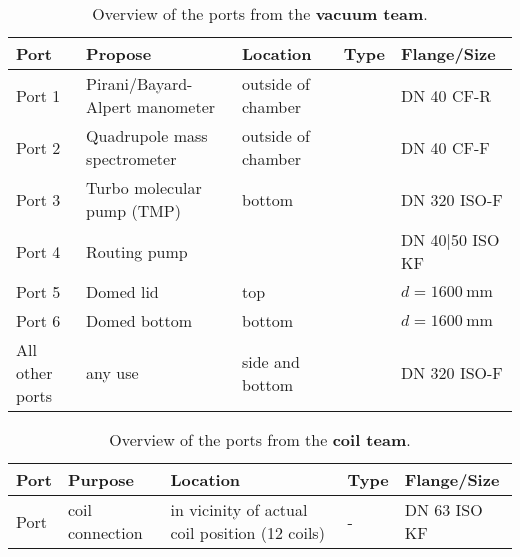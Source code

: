 \documentclass{article}
\begin{document}
\begin{table}[H]
    \centering
    \caption{Overview of the ports from the \textbf{vacuum team}.}
    \begin{tabular}{>{\raggedright\arraybackslash}p{2cm} >{\raggedright\arraybackslash}p{3cm} >{\raggedright\arraybackslash}p{3.5cm} >{\raggedright\arraybackslash}p{2cm} >{\raggedright\arraybackslash}p{3.5cm}}
        \toprule
        \textbf{Port}   & \textbf{Propose}               & \textbf{Location}  & \textbf{Type} & \textbf{Flange/Size}          \\
        \midrule
        Port 1          & Pirani/Bayard-Alpert manometer & outside of chamber &               & DN 40 CF-R                    \\
        Port 2          & Quadrupole mass spectrometer   & outside of chamber &               & DN 40 CF-F                    \\
        \midrule
        Port 3          & Turbo molecular pump (TMP)     & bottom             &               & DN 320 ISO-F                  \\
        Port 4          & Routing pump                   &                    &               & DN 40|50 ISO KF               \\
        \midrule
        Port 5          & Domed lid                      & top                &               & $d = 1600\ \si{\milli\meter}$ \\
        Port 6          & Domed bottom                   & bottom             &               & $d = 1600\ \si{\milli\meter}$ \\
        \midrule
        All other ports & any use                        & side and bottom    &               & DN 320 ISO-F                  \\
        \bottomrule
    \end{tabular}
    \label{tab:vacuum_ports}
\end{table}


\begin{table}[H]
    \centering
    \caption{Overview of the ports from the \textbf{coil team}.}
    \begin{tabular}{>{\raggedright\arraybackslash}p{2cm} >{\raggedright\arraybackslash}p{3cm} >{\raggedright\arraybackslash}p{3.5cm} >{\raggedright\arraybackslash}p{3.5cm} >{\raggedright\arraybackslash}p{2cm}}
        \toprule
        \textbf{Port} & \textbf{Purpose} & \textbf{Location}                              & \textbf{Type}       & \textbf{Flange/Size} \\
        \midrule
        Port         &    coil connection         & in vicinity of actual coil position (12 coils) &  - &  DN 63 ISO KF  \\
        \bottomrule
    \end{tabular}
\end{table}
\end{document}
